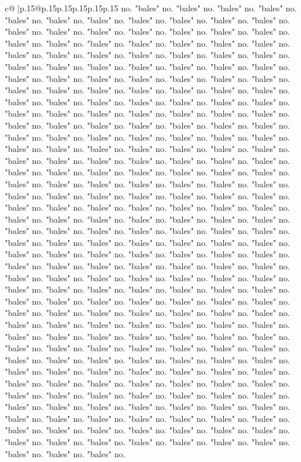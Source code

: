 \documentclass{article}
\begin{document}
{\begin{supertabular}{c@{$\;$}|p{.15\linewidth}@{}p{.15\linewidth}p{.15\linewidth}p{.15\linewidth}p{.15\linewidth}p{.15\linewidth}}
{{{no. "bales" no. "bales" no. "bales" no. "bales" no. "bales" no. "bales" no. "bales" no. "bales" no. "bales" no. "bales" no. "bales" no. "bales" no. "bales" no. "bales" no. "bales" no. "bales" no. "bales" no. "bales" no. "bales" no. "bales" no. "bales" no. "bales" no. "bales" no. "bales" no. "bales" no. "bales" no. "bales" no. "bales" no. "bales" no. "bales" no. "bales" no. "bales" no. "bales" no. "bales" no. "bales" no. "bales" no. "bales" no. "bales" no. "bales" no. "bales" no. "bales" no. "bales" no. "bales" no. "bales" no. "bales" no. "bales" no. "bales" no. "bales" no. "bales" no. "bales" no. "bales" no. "bales" no. "bales" no. "bales" no. "bales" no. "bales" no. "bales" no. "bales" no. "bales" no. "bales" no. "bales" no. "bales" no. "bales" no. "bales" no. "bales" no. "bales" no. "bales" no. "bales" no. "bales" no. "bales" no. "bales" no. "bales" no. "bales" no. "bales" no. "bales" no. "bales" no. "bales" no. "bales" no. "bales" no. "bales" no. "bales" no. "bales" no. "bales" no. "bales" no. "bales" no. "bales" no. "bales" no. "bales" no. "bales" no. "bales" no. "bales" no. "bales" no. "bales" no. "bales" no. "bales" no. "bales" no. "bales" no. "bales" no. "bales" no. "bales" no. "bales" no. "bales" no. "bales" no. "bales" no. "bales" no. "bales" no. "bales" no. "bales" no. "bales" no. "bales" no. "bales" no. "bales" no. "bales" no. "bales" no. "bales" no. "bales" no. "bales" no. "bales" no. "bales" no. "bales" no. "bales" no. "bales" no. "bales" no. "bales" no. "bales" no. "bales" no. "bales" no. "bales" no. "bales" no. "bales" no. "bales" no. "bales" no. "bales" no. "bales" no. "bales" no. "bales" no. "bales" no. "bales" no. "bales" no. "bales" no. "bales" no. "bales" no. "bales" no. "bales" no. "bales" no. "bales" no. "bales" no. "bales" no. "bales" no. "bales" no. "bales" no. "bales" no. "bales" no. "bales" no. "bales" no. "bales" no. "bales" no. "bales" no. "bales" no. "bales" no. "bales" no. "bales" no. "bales" no. "bales" no. "bales" no. "bales" no. "bales" no. "bales" no. "bales" no. "bales" no. "bales" no. "bales" no. "bales" no. "bales" no. "bales" no. "bales" no. "bales" no. "bales" no. "bales" no. "bales" no. "bales" no. "bales" no. "bales" no. "bales" no. "bales" no. "bales" no. "bales" no. "bales" no. "bales" no. "bales" no. "bales" no. "bales" no. "bales" no. "bales" no. "bales" no. "bales" no. "bales" no. "bales" no. "bales" no. "bales" no. "bales" no. "bales" no. "bales" no. "bales" no. "bales" no. "bales" no. "bales" no. "bales" no. "bales" no. "bales" no. "bales" no. "bales" no. "bales" no. "bales" no. "bales" no. "bales" no. "bales" no. "bales" no. "bales" no. "bales" no. "bales" no. "bales" no. "bales" no. "bales" no. "bales" no. "bales" no. "bales" no. "bales" no. "bales" no. "bales" no. "bales" no. "bales" no. "bales" no. "bales" no. "bales" no. "bales" no. "bales" no. "bales" no. "bales" no. "bales" no. "bales" no. "bales" no. "bales" no. "bales" no. "bales" no. "bales" no. "bales" no. "bales" no. "bales" no. "bales" no. "bales" no. "bales" no. "bales" no. "bales" no. "bales" no. "bales" no. "bales" no. "bales" no. "bales" no. "bales" no. "bales" no. "bales" no. "bales" no. "bales" no. "bales" no. "bales" no. }}}
\end{supertabular}}
\end{document}
